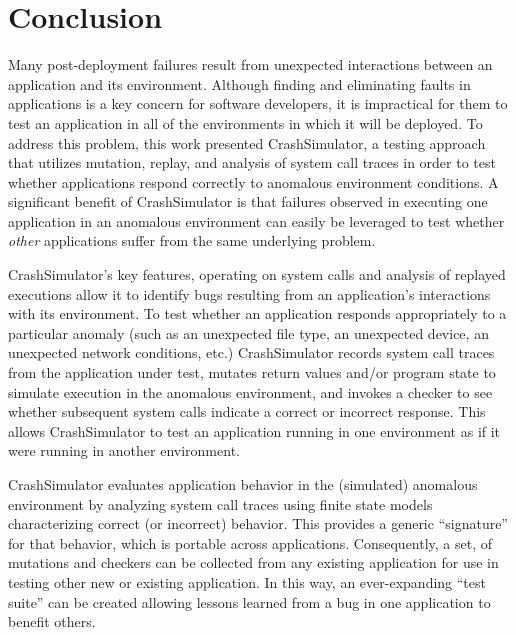 \section{Conclusion}

Many post-deployment failures result from
unexpected interactions between an application and its environment.
Although finding and eliminating faults in applications is a key concern for software developers, it is impractical for them to test an application in all of the
environments in which it will be deployed.
 To address this
problem, this work presented CrashSimulator, a testing
approach that utilizes mutation, replay, and analysis of system call traces
in order to test whether applications respond correctly to 
anomalous environment conditions.
A significant benefit of CrashSimulator is that failures observed
in executing one application in an anomalous environment can
easily be leveraged to test whether {\em other} applications
suffer from the same underlying problem.

CrashSimulator's key features, operating on system calls and analysis of replayed executions allow it to identify bugs
resulting from an application's interactions with its environment.
To test whether an application responds appropriately to a particular
anomaly (such as an unexpected file type, an unexpected device, an unexpected
network conditions, etc.)
CrashSimulator records system call traces from the application under test,
mutates return values and/or program state to simulate execution in 
the anomalous environment, and invokes a checker to see whether
subsequent system calls indicate a correct or incorrect response.
This allows
CrashSimulator to test an application running in one environment
as if it were running in another environment. 


CrashSimulator evaluates application behavior in the (simulated) anomalous environment
by analyzing system call traces using
finite state models characterizing correct (or incorrect) behavior.
This provides a generic ``signature'' for that behavior, which is
portable across applications. 
Consequently, a set, of mutations and checkers can be collected from any existing
application for use in testing other new or existing application. 
In this way, an ever-expanding ``test suite'' can
be created allowing lessons learned from a bug in one application to benefit others.

